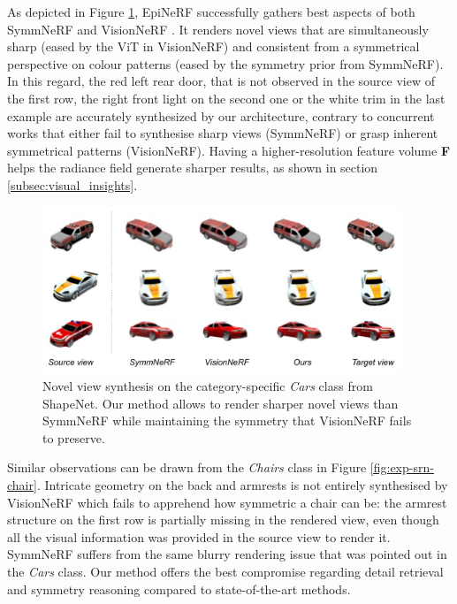 As depicted in Figure \ref{fig:exp-srn-car}, EpiNeRF successfully gathers best aspects of both SymmNeRF \citep{li2022symmnerf} and VisionNeRF \citep{lin2023vision}. It renders novel views that are simultaneously sharp (eased by the ViT in VisionNeRF) and consistent from a symmetrical perspective on colour patterns (eased by the symmetry prior from SymmNeRF). In this regard, the red left rear door, that is not observed in the source view of the first row,  the right front light on the second one or the white trim in the last example are accurately synthesized by our architecture, contrary to concurrent works that either fail to synthesise sharp views (SymmNeRF) or grasp inherent symmetrical patterns (VisionNeRF). Having a higher-resolution feature volume \textbf{F} helps the radiance field generate sharper results, as shown in section \ref{subsec:visual_insights}. 

\begin{figure}[htb!]
    \center
  \includegraphics[height=5cm]{images/epinerf/exp-srn-cars.png}
  \caption{Novel view synthesis on the category-specific \textit{Cars} class from ShapeNet. Our method allows to render sharper novel views than SymmNeRF \citep{li2022symmnerf} while maintaining the symmetry that VisionNeRF \citep{lin2023vision} fails to preserve.}
  \label{fig:exp-srn-car}
\end{figure}

 Similar observations can be drawn from the \textit{Chairs} class in Figure \ref{fig:exp-srn-chair}. Intricate geometry on the back and armrests is not entirely synthesised by VisionNeRF  which fails to apprehend how symmetric a chair can be: the armrest structure on the first row is partially missing in the rendered view, even though all the visual information was provided in the source view to render it. SymmNeRF suffers from the same blurry rendering issue that was pointed out in the \textit{Cars} class. Our method offers the best compromise regarding detail retrieval and symmetry reasoning compared to state-of-the-art methods.
 
